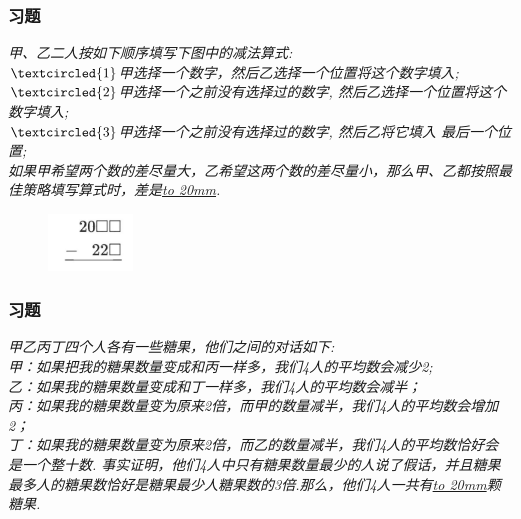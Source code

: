 \begin{frame}
    \frametitle{习题\theframecounter}
    \textit{甲、乙二人按如下顺序填写下图中的减法算式:\\
    $\textcircled{1}$甲选择一个数字，然后乙选择一个位置将这个数字填入;\\
    $\textcircled{2}$甲选择一个之前没有选择过的数字, 然后乙选择一个位置将这个数字填入;\\
    $\textcircled{3}$甲选择一个之前没有选择过的数字, 然后乙将它填入    最后一个位置;\\
    如果甲希望两个数的差尽量大，乙希望这两个数的差尽量小，那么甲、乙都按照最佳策略填写算式时，差是\underline{\hbox to 20mm{}}.}
    \begin{figure}[H] 
        \centering
        \includegraphics[width=0.2\textwidth]{./pics/Chapter_7/11.png}
    \end{figure}
\end{frame}




\begin{frame}
    \frametitle{习题\theframecounter}
    \textit{甲乙丙丁四个人各有一些糖果，他们之间的对话如下:\\
    甲：如果把我的糖果数量变成和丙一样多，我们4人的平均数会减少2;\\
    乙：如果我的糖果数量变成和丁一样多，我们4人的平均数会减半；\\
    丙：如果我的糖果数量变为原来2倍，而甲的数量减半，我们4人的平均数会增加 2；\\
    丁：如果我的糖果数量变为原来2倍，而乙的数量减半，我们4人的平均数恰好会是一个整十数.
事实证明，他们4人中只有糖果数量最少的人说了假话，并且糖果最多人的糖果数恰好是糖果最少人糖果数的3倍.那么，他们4人一共有\underline{\hbox to 20mm{}}颗糖果.}
\end{frame}

